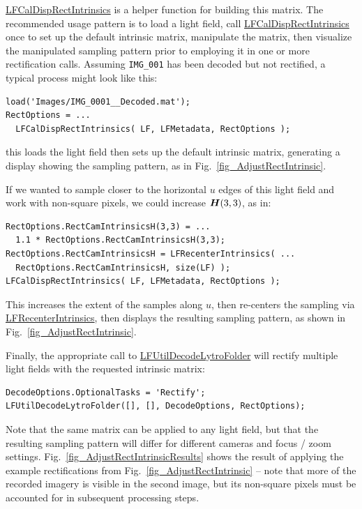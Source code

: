 \documentclass[onecolumn]{article}
\newcommand{\CiteFunc}[1]{\hyperlink{#1}{\small #1}}
\newcommand{\SymbolText}[1]{\texttt{\small #1}}
\begin{document}
\CiteFunc{LFCalDispRectIntrinsics} is a helper function for building this matrix. The recommended usage pattern is to load a light field, call \CiteFunc{LFCalDispRectIntrinsics} once to set up the default intrinsic matrix, manipulate the matrix, then visualize the manipulated sampling pattern prior to employing it in one or more rectification calls.  Assuming \SymbolText{IMG\_001} has been decoded but not rectified, a typical process might look like this:
\begin{Verbatim}
load('Images/IMG_0001__Decoded.mat');
RectOptions = ...
  LFCalDispRectIntrinsics( LF, LFMetadata, RectOptions );
\end{Verbatim}
this loads the light field then sets up the default intrinsic matrix, generating a display showing the sampling pattern, as in Fig.~\ref{fig_AdjustRectIntrinsic}.

If we wanted to sample closer to the horizontal $u$ edges of this light field and work with non-square pixels, we could increase $\mat{H}(3,3)$, as in:
\begin{Verbatim}
RectOptions.RectCamIntrinsicsH(3,3) = ...
  1.1 * RectOptions.RectCamIntrinsicsH(3,3);
RectOptions.RectCamIntrinsicsH = LFRecenterIntrinsics( ...
  RectOptions.RectCamIntrinsicsH, size(LF) );
LFCalDispRectIntrinsics( LF, LFMetadata, RectOptions );
\end{Verbatim}
This increases the extent of the samples along $u$, then re-centers the sampling via \CiteFunc{LFRecenterIntrinsics}, then displays the resulting sampling pattern, as shown in Fig.~\ref{fig_AdjustRectIntrinsic}.

Finally, the appropriate call to \CiteFunc{LFUtilDecodeLytroFolder} will rectify multiple light fields with the requested intrinsic matrix:
\begin{Verbatim}
DecodeOptions.OptionalTasks = 'Rectify';
LFUtilDecodeLytroFolder([], [], DecodeOptions, RectOptions);
\end{Verbatim}
Note that the same matrix can be applied to any light field, but that the resulting sampling pattern will differ for different cameras and focus / zoom settings.  Fig.~\ref{fig_AdjustRectIntrinsicResults} shows the result of applying the example rectifications from Fig.~\ref{fig_AdjustRectIntrinsic} -- note that more of the recorded imagery is visible in the second image, but its non-square pixels must be accounted for in subsequent processing steps.
\end{document}
